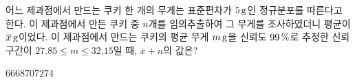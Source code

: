 어느 제과점에서 만드는 쿠키 한 개의 무게는 표준편차가 $5\mkern3mu \mathrm{g}$인 정규분포를 따른다고 한다. 이 제과점에서 만든 쿠키 중 $n$개를 임의추출하여 그 무게를 조사하였더니 평균이 $\overline{x}\mkern3mu \mathrm{g}$이었다. 이 제과점에서 만드는 쿠키의 평균 무게 $m\mkern3mu \mathrm{g}$을 신뢰도 $99\mkern3mu \%$로 추정한 신뢰구간이 $27.85\le m\le 32.15$일 때, $\overline{x}+n$의 값은? 
\begin{choices32}{$66$}{$68$}{$70$}{$72$}{$74$}\end{choices32}
